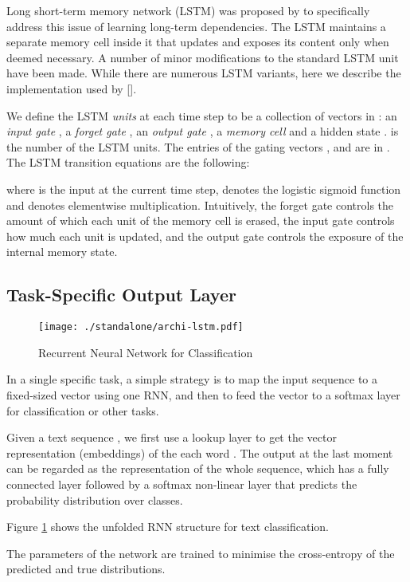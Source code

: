 \documentclass{article}
\newcommand\newcite[1]{\citeauthor{#1} [\citeyear{#1}]}
\begin{document}
Long short-term memory network (LSTM) was proposed by \cite{hochreiter1997long} to specifically address this issue of learning long-term dependencies. The LSTM maintains a separate memory cell inside it that updates and exposes its content only when deemed necessary.
A number of minor modifications to the standard LSTM unit have been made. While there are numerous LSTM variants, here we describe the implementation used by \newcite{graves2013generating}.

We define the LSTM \emph{units} at each time step  to be a collection of vectors in : an \emph{input gate} , a \emph{forget gate} ,  an \emph{output gate} , a \emph{memory cell}  and a hidden state .  is the number of the LSTM units. The entries of the gating vectors ,  and  are in .
The LSTM transition equations are the following:

where  is the input at the current time step,  denotes the logistic sigmoid function and  denotes elementwise multiplication. Intuitively, the forget gate controls the amount of which each unit of the memory cell is erased, the input gate controls how much each unit is updated, and the output gate controls the exposure of the internal memory state.


\subsection{Task-Specific Output Layer}
\begin{figure}[t]\centering
  \texttt{[image: ./standalone/archi-lstm.pdf]}
  \caption{Recurrent Neural Network for Classification}\label{fig:rnn}
\end{figure}

In a single specific task, a simple strategy is to map the input sequence to a fixed-sized vector using one RNN, and then to feed the vector to a softmax layer for classification or other tasks.



Given a text sequence , we first use a lookup layer to get the vector representation (embeddings)  of the each word .
The output at the last moment   can be regarded as the representation of the whole sequence, which has a fully connected layer followed by a softmax non-linear layer that predicts the probability distribution over classes.


Figure \ref{fig:rnn} shows the unfolded RNN structure for text classification.

The parameters of the network are trained to minimise the cross-entropy of the predicted and true distributions.
\end{document}
